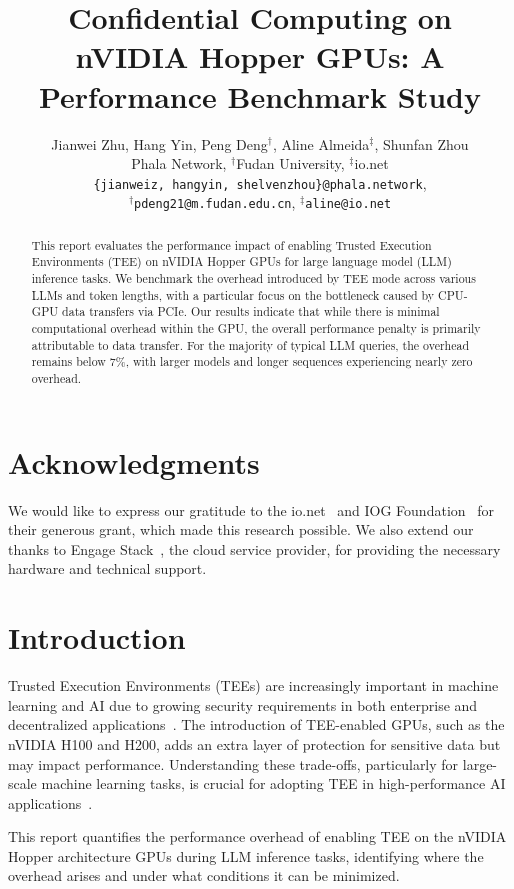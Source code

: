 \documentclass{article}
\title{Confidential Computing on nVIDIA Hopper GPUs: A Performance Benchmark Study}
\author{
  Jianwei Zhu,
  Hang Yin,
  Peng Deng$^\dagger$,
  Aline Almeida$^\ddagger$,
  Shunfan Zhou \\
  Phala Network, $^\dagger$Fudan University, $^\ddagger$io.net \\
  \texttt{\{jianweiz, hangyin, shelvenzhou\}@phala.network}, \\
  \texttt{$^\dagger$pdeng21@m.fudan.edu.cn},
  \texttt{$^\ddagger$aline@io.net}
}
\begin{document}
\maketitle

\begin{abstract}
    This report evaluates the performance impact of enabling Trusted Execution Environments (TEE) on nVIDIA Hopper GPUs for large language model (LLM) inference tasks. We benchmark the overhead introduced by TEE mode across various LLMs and token lengths, with a particular focus on the bottleneck caused by CPU-GPU data transfers via PCIe. Our results indicate that while there is minimal computational overhead within the GPU, the overall performance penalty is primarily attributable to data transfer. For the majority of typical LLM queries, the overhead remains below 7\%, with larger models and longer sequences experiencing nearly zero overhead.
\end{abstract}

\section*{Acknowledgments}

We would like to express our gratitude to the io.net~\cite{ionet} and IOG Foundation~\cite{iog} for their generous grant, which made this research possible. We also extend our thanks to Engage Stack~\cite{engagestack}, the cloud service provider, for providing the necessary hardware and technical support.

\section{Introduction}

Trusted Execution Environments (TEEs) are increasingly important in machine learning and AI due to growing security requirements in both enterprise and decentralized applications~\cite{sabt2015trusted, matetic2018delegatee, ayoade2018decentralized}. The introduction of TEE-enabled GPUs, such as the nVIDIA H100 and H200, adds an extra layer of protection for sensitive data but may impact performance. Understanding these trade-offs, particularly for large-scale machine learning tasks, is crucial for adopting TEE in high-performance AI applications~\cite{yudha2022lite, wang2024confidential}.

This report quantifies the performance overhead of enabling TEE on the nVIDIA Hopper architecture GPUs during LLM inference tasks, identifying where the overhead arises and under what conditions it can be minimized.
\end{document}
